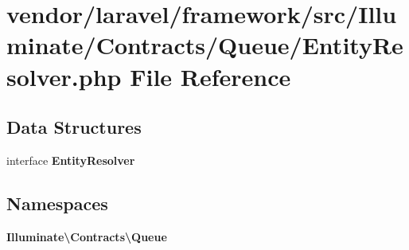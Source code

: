 \section{vendor/laravel/framework/src/\+Illuminate/\+Contracts/\+Queue/\+Entity\+Resolver.php File Reference}
\label{_entity_resolver_8php}
\subsection*{Data Structures}
\begin{DoxyCompactItemize}
\item 
interface {\bf Entity\+Resolver}
\end{DoxyCompactItemize}
\subsection*{Namespaces}
\begin{DoxyCompactItemize}
\item 
 {\bf Illuminate\textbackslash{}\+Contracts\textbackslash{}\+Queue}
\end{DoxyCompactItemize}
